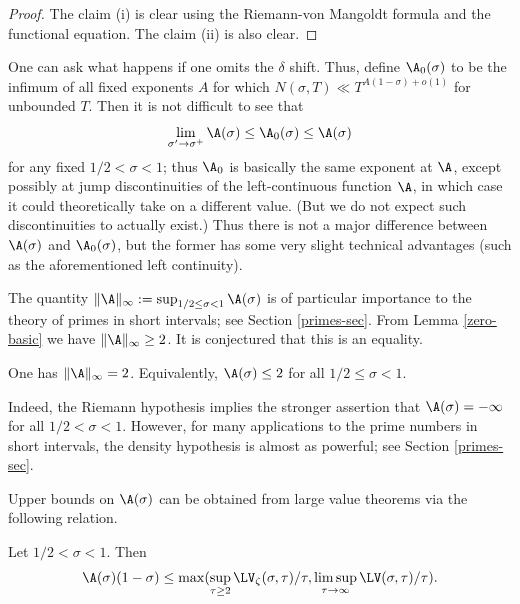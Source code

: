 \begin{proof} The claim (i) is clear using the Riemann-von Mangoldt formula \cite[Theorem 1.7]{ivic} and the functional equation.  The claim (ii) is also clear.
\end{proof}

\begin{remark} One can ask what happens if one omits the $\delta$ shift.  Thus, define $\A_0(\sigma)$ to be the infimum of all fixed exponents $A$ for which  $N(\sigma,T) \ll T^{A (1-\sigma)+o(1)}$ for unbounded $T$. Then it is not difficult to see that
$$ \lim_{\sigma' \to \sigma^+} \A(\sigma) \leq \A_0(\sigma) \leq \A(\sigma)$$
for any fixed $1/2 < \sigma < 1$; thus $\A_0$ is basically the same exponent at $\A$, except possibly at jump discontinuities of the left-continuous function $\A$, in which case it could theoretically take on a different value.  (But we do not expect such discontinuities to actually exist.)  Thus there is not a major difference between $\A(\sigma)$ and $\A_0(\sigma)$, but the former has some very slight technical advantages (such as the aforementioned left continuity).
\end{remark}

The quantity $\|\A\|_\infty := \sup_{1/2 \leq \sigma < 1} \A(\sigma)$ is of particular importance to the theory of primes in short intervals; see Section \ref{primes-sec}.  From Lemma \ref{zero-basic} we have $\|\A\|_\infty \geq 2$.  It is conjectured that this is an equality.

\begin{conjecture}\label{density-hypothesis}  One has $\|\A\|_\infty=2$.  Equivalently, $\A(\sigma) \leq 2$ for all $1/2 \leq \sigma < 1$.
\end{conjecture}

Indeed, the Riemann hypothesis implies the stronger assertion that $\A(\sigma) = -\infty$ for all $1/2 < \sigma < 1$.  However, for many applications to the prime numbers in short intervals, the density hypothesis is almost as powerful; see Section \ref{primes-sec}.

Upper bounds on $\A(\sigma)$ can be obtained from large value theorems via the following relation.

\begin{lemma}\label{zero-from-large}  Let $1/2 < \sigma < 1$.  Then
$$ \A(\sigma)(1-\sigma) \leq \max( \sup_{\tau \geq 2} \LV_\zeta(\sigma,\tau)/\tau, \limsup_{\tau \to \infty} \LV(\sigma,\tau)/\tau ).$$
\end{lemma}

